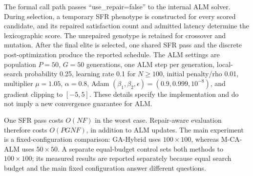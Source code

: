 The formal call path passes ``use\_repair=false'' to the internal ALM solver. During selection, a temporary SFR phenotype is constructed for every scored candidate, and its repaired satisfaction count and admitted latency determine the lexicographic score. The unrepaired genotype is retained for crossover and mutation. After the final elite is selected, one shared SFR pass and the discrete post-optimization produce the reported schedule. The ALM settings are population $P=50$, $G=50$ generations, one ALM step per generation, local-search probability 0.25, learning rate 0.1 for $N\geq100$, initial penalty/rho 0.01, multiplier $\mu=1.05$, $\alpha=0.8$, Adam $(\beta_1,\beta_2,\epsilon)=(0.9,0.999,10^{-8})$, and gradient clipping to $[-5,5]$. These details specify the implementation and do not imply a new convergence guarantee for ALM.

One SFR pass costs $O(NF)$ in the worst case. Repair-aware evaluation therefore costs $O(PGNF)$, in addition to ALM updates. The main experiment is a fixed-configuration comparison: GA-Hybrid uses $100\times100$, whereas M-CA-ALM uses $50\times50$. A separate equal-budget control sets both methods to $100\times100$; its measured results are reported separately because equal search budget and the main fixed configuration answer different questions.
